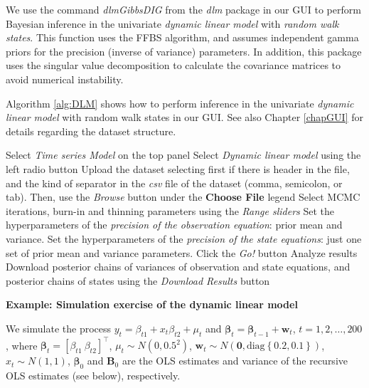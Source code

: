 We use the command \textit{dlmGibbsDIG} from the \textit{dlm} package in our GUI to perform Bayesian inference in the univariate \textit{dynamic linear model} with \textit{random walk states}. This function uses the FFBS algorithm, and assumes independent gamma priors for the precision (inverse of variance) parameters. In addition, this package uses the singular value decomposition to calculate the covariance matrices to avoid numerical instability.

Algorithm \ref{alg:DLM} shows how to perform inference in the univariate \textit{dynamic linear model} with random walk states in our GUI. See also Chapter \ref{chapGUI} for details regarding the dataset structure.

\begin{algorithm}[h!]
	\caption{Dynamic linear models}\label{alg:DLM}
	\begin{algorithmic}[1]  		 			
		\State Select \textit{Time series Model} on the top panel
		\State Select \textit{Dynamic linear model} using the left radio button
		\State Upload the dataset selecting first if there is header in the file, and the kind of separator in the \textit{csv} file of the dataset (comma, semicolon, or tab). Then, use the \textit{Browse} button under the \textbf{Choose File} legend
		\State Select MCMC iterations, burn-in and thinning parameters using the \textit{Range sliders}
		\State Set the hyperparameters of the \textit{precision of the observation equation}: prior mean and variance.
		\State Set the hyperparameters of the \textit{precision of the state equations}: just one set of prior mean and variance parameters.
		\State Click the \textit{Go!} button
		\State Analyze results
		\State Download posterior chains of variances of observation and state equations, and posterior chains of states using the \textit{Download Results} button
	\end{algorithmic} 
\end{algorithm}

\textbf{Example: Simulation exercise of the dynamic linear model}

We simulate the process $y_t=\beta_{t1}+{x}_t{\beta}_{t2}+\mu_t$ and $\bm{\beta}_t=\bm{\beta}_{t-1}+\bm{w}_t$, $t=1,2,\dots,200$, where $\bm{\beta}_t=[\beta_{t1} \ {\beta}_{t2}]^{\top}$, $\mu_t\sim N(0,0.5^2)$, $\bm{w}_t\sim N(\bm{0},\text{diag}\left\{0.2,0.1\right\})$, $x_t\sim N(1, 1)$, $\bm{\beta}_0$ and $\bm{B}_0$ are the OLS estimates and variance of the recursive OLS estimates (see below), respectively.

